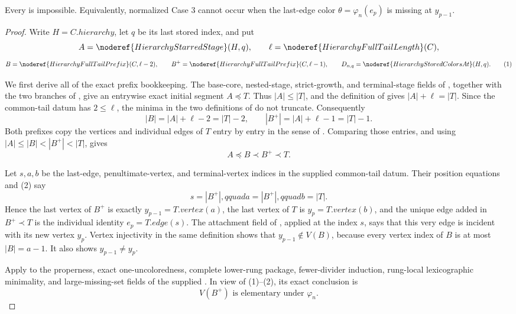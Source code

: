 \begin{lemma}
Every  is impossible.
Equivalently, normalized Case 3 cannot occur when the last-edge color
\(\theta=\varphi_n(e_p)\) is missing at \(y_{p-1}\).
\end{lemma}
\begin{proof}
Write \(H=C.\mathit{hierarchy}\), let \(q\) be its last stored index, and
put
\[
 A=\noderef{HierarchyStarredStage}(H,q),\qquad
 \ell=\noderef{HierarchyFullTailLength}(C),
\]
\[
 B=\noderef{HierarchyFullTailPrefix}(C,\ell-2),\qquad
 B^+=\noderef{HierarchyFullTailPrefix}(C,\ell-1),\qquad
 D_{n,q}=\noderef{HierarchyStoredColorsAt}(H,q).              \tag{1}
\]

We first derive all of the exact prefix bookkeeping.  The base-core,
nested-stage, strict-growth, and terminal-stage fields of
, together with the two branches of
, give an entrywise exact initial segment
\(A\preccurlyeq T\).  Thus \(|A|\leq |T|\), and the definition of
 gives
\(|A|+\ell=|T|\).  Since the common-tail datum has \(2\leq\ell\), the
minima in the two definitions of  do not
truncate.  Consequently
\[
 |B|=|A|+\ell-2=|T|-2,
 \qquad |B^+|=|A|+\ell-1=|T|-1.                              \tag{2}
\]
Both prefixes copy the vertices and individual edges of \(T\) entry by
entry in the sense of .  Comparing
those entries, and using \(|A|\leq|B|<|B^+|<|T|\), gives
\[
                    A\preccurlyeq B\prec B^+\prec T.          \tag{3}
\]

Let \(s,a,b\) be the last-edge, penultimate-vertex, and terminal-vertex
indices in the supplied common-tail datum.  Their position equations and
(2) say
\[
 s=|B^+|,qquad a=|B^+|,qquad b=|T|.
\]
Hence the last vertex of \(B^+\) is exactly \(y_{p-1}=T.\mathit{vertex}(a)\),
the last vertex of \(T\) is \(y_p=T.\mathit{vertex}(b)\), and the unique
edge added in \(B^+\prec T\) is the individual identity
\(e_p=T.\mathit{edge}(s)\).  The attachment field of
, applied at the index \(s\), says that this very
edge is incident with its new vertex \(y_p\).  Vertex injectivity in the
same definition shows that \(y_{p-1}\notin V(B)\), because every vertex
index of \(B\) is at most \(|B|=a-1\).  It also shows
\(y_{p-1}\ne y_p\).

Apply  to the
properness, exact one-uncoloredness, complete lower-rung package,
fewer-divider induction, rung-local lexicographic minimality, and
large-missing-set fields of the supplied
.  In view of (1)--(2),
its exact conclusion is
\[
             V(B^+)\text{ is elementary under }\varphi_n.     \tag{4}
\]


\end{proof}
